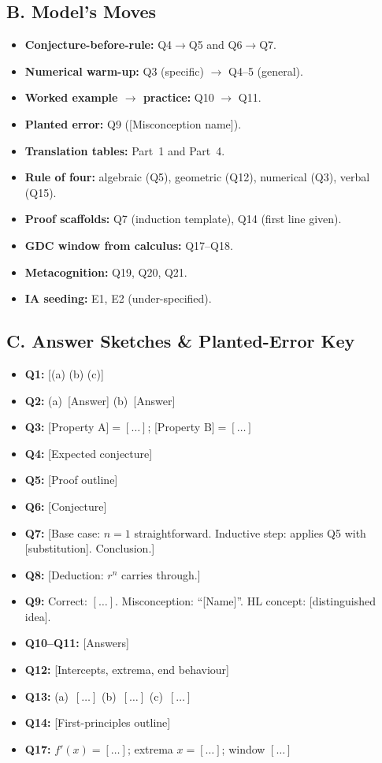 \documentclass[11pt,a4paper]{article}
\begin{document}
\subsection*{B. Model's Moves}
\begin{itemize}
  \item \textbf{Conjecture-before-rule:} Q4$\to$Q5 and Q6$\to$Q7.
  \item \textbf{Numerical warm-up:} Q3 (specific) $\to$ Q4--5 (general).
  \item \textbf{Worked example $\to$ practice:} Q10 $\to$ Q11.
  \item \textbf{Planted error:} Q9 ([Misconception name]).
  \item \textbf{Translation tables:} Part~1 and Part~4.
  \item \textbf{Rule of four:} algebraic (Q5), geometric (Q12), numerical (Q3), verbal (Q15).
  \item \textbf{Proof scaffolds:} Q7 (induction template), Q14 (first line given).
  \item \textbf{GDC window from calculus:} Q17--Q18.
  \item \textbf{Metacognition:} Q19, Q20, Q21.
  \item \textbf{IA seeding:} E1, E2 (under-specified).
\end{itemize}

\subsection*{C. Answer Sketches \& Planted-Error Key}
\begin{itemize}
  \item \textbf{Q1:} [(a) (b) (c)]
  \item \textbf{Q2:} (a)~[Answer] (b)~[Answer]
  \item \textbf{Q3:} [Property A]$=[\ldots]$; [Property B]$=[\ldots]$
  \item \textbf{Q4:} [Expected conjecture]
  \item \textbf{Q5:} [Proof outline]
  \item \textbf{Q6:} [Conjecture]
  \item \textbf{Q7:} [Base case: $n=1$ straightforward. Inductive step: applies Q5 with [substitution]. Conclusion.]
  \item \textbf{Q8:} [Deduction: $r^n$ carries through.]
  \item \textbf{Q9:} Correct: $[\ldots]$. Misconception: ``[Name]''. HL concept: [distinguished idea].
  \item \textbf{Q10--Q11:} [Answers]
  \item \textbf{Q12:} [Intercepts, extrema, end behaviour]
  \item \textbf{Q13:} (a)~$[\ldots]$ (b)~$[\ldots]$ (c)~$[\ldots]$
  \item \textbf{Q14:} [First-principles outline]
  \item \textbf{Q17:} $f'(x)=[\ldots]$; extrema $x=[\ldots]$; window $[\ldots]$
\end{itemize}
\end{document}
